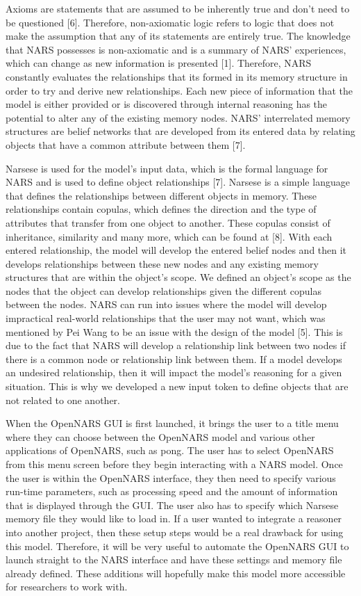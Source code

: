 \documentclass[conference]{IEEEtran}
\begin{document}
	Axioms are statements that are assumed to be inherently true and don't need to be questioned [6]. Therefore, non-axiomatic logic refers to logic that does not make the assumption that any of its statements are entirely true. The knowledge that NARS possesses is non-axiomatic and is a summary of NARS' experiences, which can change as new information is presented [1]. Therefore, NARS constantly evaluates the relationships that its formed in its memory structure in order to try and derive new relationships. Each new piece of information that the model is either provided or is discovered through internal reasoning has the potential to alter any of the existing memory nodes. NARS' interrelated memory structures are belief networks that are developed from its entered data by relating objects that have a common attribute between them [7]. 
	
	Narsese is used for the model's input data, which is the formal language for NARS and is used to define object relationships [7]. Narsese is a simple language that defines the relationships between different objects in memory. These relationships contain copulas, which defines the direction and the type of attributes that transfer from one object to another. These copulas consist of inheritance, similarity and many more, which can be found at [8]. With each entered relationship, the model will develop the entered belief nodes and then it develops relationships between these new nodes and any existing memory structures that are within the object's scope. We defined an object's scope as the nodes that the object can develop relationships given the different copulas between the nodes. NARS can run into issues where the model will develop impractical real-world relationships that the user may not want, which was mentioned by Pei Wang to be an issue with the design of the model [5]. This is due to the fact that NARS will develop a relationship link between two nodes if there is a common node or relationship link between them. If a model develops an undesired relationship, then it will impact the model's reasoning for a given situation. This is why we developed a new input token to define objects that are not related to one another.
	
	When the OpenNARS GUI is first launched, it brings the user to a title menu where they can choose between the OpenNARS model and various other applications of OpenNARS, such as pong. The user has to select OpenNARS from this menu screen before they begin interacting with a NARS model. Once the user is within the OpenNARS interface, they then need to specify various run-time parameters, such as processing speed and the amount of information that is displayed through the GUI. The user also has to specify which Narsese memory file they would like to load in. If a user wanted to integrate a reasoner into another project, then these setup steps would be a real drawback for using this model. Therefore, it will be very useful to automate the OpenNARS GUI to launch straight to the NARS interface and have these settings and memory file already defined. These additions will hopefully make this model more accessible for researchers to work with. 	
	
\end{document}
